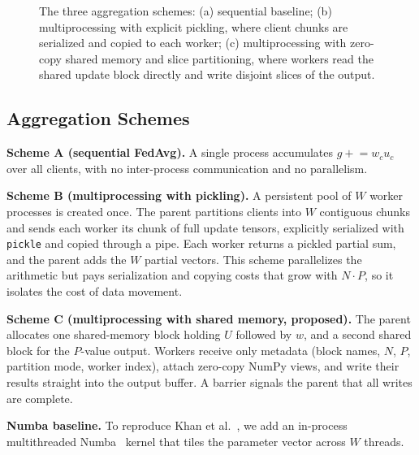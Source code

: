 \documentclass[conference]{IEEEtran}
\begin{document}
\begin{figure}[t]
\caption{The three aggregation schemes: (a) sequential baseline; (b) multiprocessing with explicit pickling, where client chunks are serialized and copied to each worker; (c) multiprocessing with zero-copy shared memory and slice partitioning, where workers read the shared update block directly and write disjoint slices of the output.}
\label{fig:schemes}
\end{figure}

\subsection{Aggregation Schemes}
\textbf{Scheme A (sequential FedAvg).} A single process accumulates $g \mathrel{+}= w_c u_c$ over all clients, with no inter-process communication and no parallelism.

\textbf{Scheme B (multiprocessing with pickling).} A persistent pool of $W$ worker processes is created once. The parent partitions clients into $W$ contiguous chunks and sends each worker its chunk of full update tensors, explicitly serialized with \texttt{pickle} and copied through a pipe. Each worker returns a pickled partial sum, and the parent adds the $W$ partial vectors. This scheme parallelizes the arithmetic but pays serialization and copying costs that grow with $N\!\cdot\!P$, so it isolates the cost of data movement.

\textbf{Scheme C (multiprocessing with shared memory, proposed).} The parent allocates one shared-memory block holding $U$ followed by $w$, and a second shared block for the $P$-value output. Workers receive only metadata (block names, $N$, $P$, partition mode, worker index), attach zero-copy NumPy views, and write their results straight into the output buffer. A barrier signals the parent that all writes are complete.

\textbf{Numba baseline.} To reproduce Khan et al.~\cite{khan2023}, we add an in-process multithreaded Numba~\cite{numba} kernel that tiles the parameter vector across $W$ threads.
\end{document}
